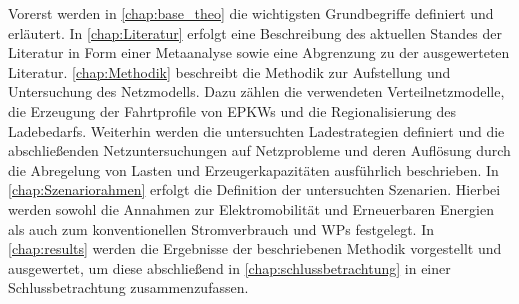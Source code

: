 Vorerst werden in \autoref{chap:base_theo} die wichtigsten Grundbegriffe definiert und erläutert.
In \autoref{chap:Literatur} erfolgt eine Beschreibung des aktuellen Standes der Literatur in Form einer Metaanalyse sowie eine Abgrenzung zu der ausgewerteten Literatur.
\autoref{chap:Methodik} beschreibt die Methodik zur Aufstellung und Untersuchung des Netzmodells.
Dazu zählen die verwendeten Verteilnetzmodelle, die Erzeugung der Fahrtprofile von \glspl{EPKW} und die Regionalisierung des Ladebedarfs.
Weiterhin werden die untersuchten Ladestrategien definiert und die abschließenden Netzuntersuchungen auf Netzprobleme und deren Auflösung durch die Abregelung von Lasten und Erzeugerkapazitäten ausführlich beschrieben.
In \autoref{chap:Szenariorahmen} erfolgt die Definition der untersuchten Szenarien.
Hierbei werden sowohl die Annahmen zur Elektromobilität und Erneuerbaren Energien als auch zum konventionellen Stromverbrauch und \glspl{WP} festgelegt.
In \autoref{chap:results} werden die Ergebnisse der beschriebenen Methodik vorgestellt und ausgewertet, um diese abschließend in \autoref{chap:schlussbetrachtung} in einer Schlussbetrachtung zusammenzufassen.

\clearpage
